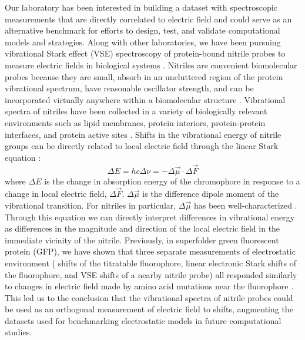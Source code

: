 Our laboratory has been interested in building a dataset with spectroscopic measurements that are directly correlated to electric field and could serve as an alternative benchmark for efforts to design, test, and validate computational models and strategies. 
Along with other laboratories, we have been pursuing vibrational Stark effect (VSE) spectroscopy of protein-bound nitrile probes to measure electric fields in biological systems \cite{Choi2008, Fried2015, Getahun2003, Johnson2014, McMahon2010, Oh2008, Park2000, Slocum2018, Stafford2010, Suydam2003, Waegele2009, Walker2013}. 
Nitriles are convenient biomolecular probes because they are small, absorb in an uncluttered region of the protein vibrational spectrum, have reasonable oscillator strength, and can be incorporated virtually anywhere within a biomolecular structure \cite{Getahun2003, Fafarman2006, Kirshenbaum2002, Webb2008}. 
Vibrational spectra of nitriles have been collected in a variety of biologically relevant environments such as lipid membranes, protein interiors, protein-protein interfaces, and protein active sites \cite{Shrestha2017, Slocum2016, Stafford2012, Walker2014}. 
Shifts in the vibrational energy of nitrile groups can be directly related to local electric field through the linear Stark equation \cite{Fafarman2010, Shields2000}:
\begin{equation}
\Delta E = hc \Delta \nu = - \Delta \vec{\mu} \cdot \Delta \vec{F}
\label{eq:snase-stark}
\end{equation}
where $\Delta E$ is the change in absorption energy of the chromophore in response to a change in local electric field, $\Delta \vec{F}$. 
$\Delta \vec{\mu}$ is the difference dipole moment of the vibrational transition. 
For nitriles in particular, $\Delta \vec{\mu}$ has been well-characterized \cite{Suydam2003, Andrews2000, Andrews2002}. 
Through this equation we can directly interpret differences in vibrational energy as differences in the magnitude and direction of the local electric field in the immediate vicinity of the nitrile. 
Previously, in superfolder green fluorescent protein (GFP), we have shown that three separate measurements of electrostatic environment (\pKa{} shifts of the titratable fluorophore, linear electronic Stark shifts of the fluorophore, and VSE shifts of a nearby nitrile probe) all responded similarly to changes in electric field made by amino acid mutations near the fluorophore \cite{Slocum2017}. 
This led us to the conclusion that the vibrational spectra of nitrile probes could be used as an orthogonal measurement of electric field to \pKa{} shifts, augmenting the datasets used for benchmarking electrostatic models in future computational studies.

